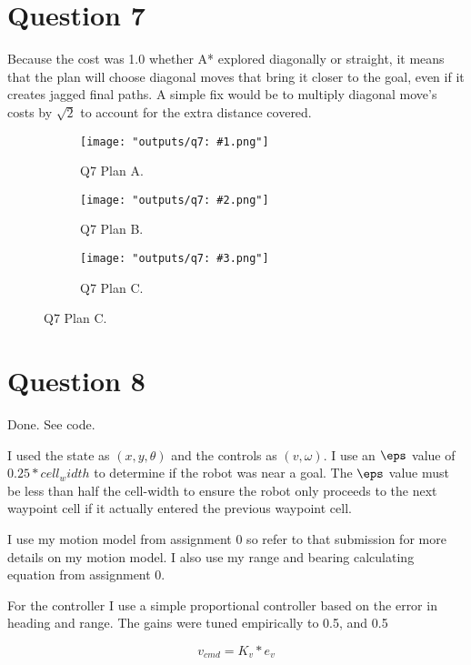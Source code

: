 \documentclass[11pt]{article}
\begin{document}
\section{Question 7}

Because the cost was 1.0 whether A* explored diagonally or straight, it means that the plan will choose diagonal moves that bring it closer to the goal, even if it creates jagged final paths. A simple fix would be to multiply diagonal move's costs by $\sqrt{2}$ to account for the extra distance covered.

\begin{figure}[H]
	\centering
    	\begin{subfigure}{0.33\textwidth}
    		\texttt{[image: "outputs/q7: \#1.png"]}
    		\caption{Q7  Plan A.}
	\end{subfigure}
    	\begin{subfigure}{0.33\textwidth}
    		\texttt{[image: "outputs/q7: \#2.png"]}
    		\caption{Q7  Plan B.}
	\end{subfigure}
    	\begin{subfigure}{0.33\textwidth}
    		\texttt{[image: "outputs/q7: \#3.png"]}
    		\caption{Q7  Plan C.}
	\end{subfigure}
	
\end{figure}

\section{Question 8}
Done. See code.

I used the state as $(x, y, \theta)$ and the controls as $(v, \omega)$. I use an $\eps$ value of $0.25 * cell_width$ to determine if the robot was near a goal. The $\eps$ value must be less than half the cell-width to ensure the robot only proceeds to the next waypoint cell if it actually entered the previous waypoint cell.

I use my motion model from assignment 0 so refer to that submission for more details on my motion model. I also use my range and bearing calculating equation from assignment 0.

For the controller I use a simple proportional controller based on the error in heading and range. The gains were tuned empirically to 0.5, and 0.5

\begin{equation}
	v_{cmd} = K_v * e_v
\end{equation}
\end{document}
